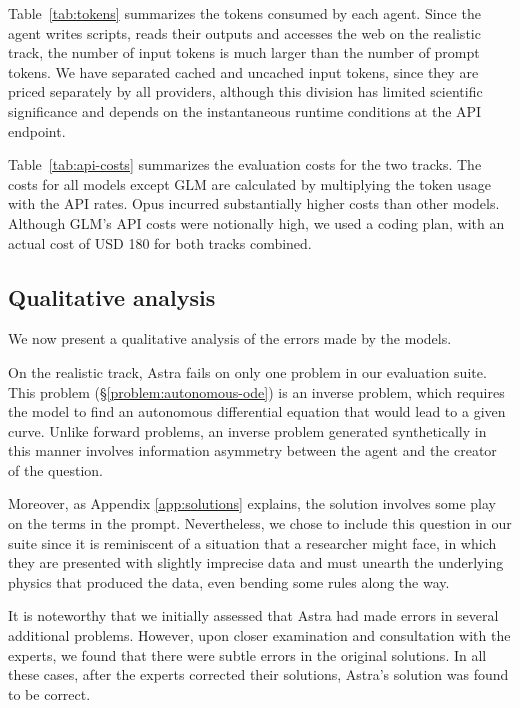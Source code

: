 \documentclass[aps,prd,reprint,superscriptaddress,nofootinbib]{revtex4-2}
\newcommand{\problemsymbol}{\S}
\DeclareRobustCommand{\problemref}[1]{\hyperref[#1]{\mbox{\problemsymbol\ref*{#1}}}}
\begin{document}
Table~\ref{tab:tokens} summarizes the tokens consumed by each agent. Since the agent writes scripts, reads their outputs and accesses the web on the realistic track, the number of input tokens is much larger than the number of prompt tokens. We have separated cached and uncached input tokens, since they are priced separately by all providers, although this division has limited scientific significance and depends on the  instantaneous runtime conditions at the API endpoint. 




Table~\ref{tab:api-costs} summarizes the evaluation costs for the two tracks. The costs for all models except GLM are calculated by multiplying the token usage with the API rates. Opus incurred substantially higher costs than other models. Although GLM's API costs were notionally high, we used a coding plan, with an actual cost of USD 180 for both tracks combined.


\subsection{Qualitative analysis}
We now present a qualitative analysis of the errors made by the models.

On the realistic track, Astra fails on only one problem in our evaluation suite. This problem  (\problemref{problem:autonomous-ode}) is an inverse problem, which requires the model to find an autonomous differential equation that would lead to a given curve. Unlike forward problems, an inverse problem generated synthetically in this manner involves information asymmetry between the agent and the creator of the question. 

Moreover, as Appendix \ref{app:solutions} explains, the solution involves some play on the terms in the prompt. Nevertheless, we chose to include this question in our suite since it is reminiscent of a situation that a researcher might face, in which they are presented with slightly imprecise data and must unearth the underlying physics that produced the data, even bending some rules along the way.

It is noteworthy that we initially assessed that Astra had made errors in several additional problems. However, upon closer examination and consultation with the experts, we found that there were subtle errors in the original solutions. In all these cases, after the experts corrected their solutions, Astra's solution was found to be correct.
\end{document}
